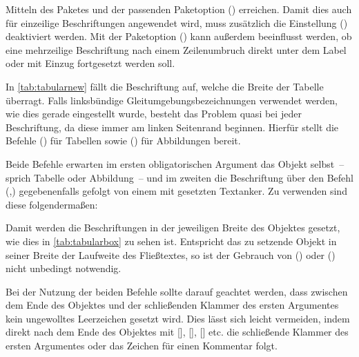 \documentclass[%
  english,ngerman,%
  cdgeometry=no,DIV=12,%
  automark,%
  listof=toc,%
]{tudscrartcl}
\begin{document}
Mitteln des Paketes  und der passenden Paketoption 
() erreichen. Damit dies auch für 
einzeilige Beschriftungen angewendet wird, muss zusätzlich die Einstellung 
() deaktiviert werden. Mit der 
Paketoption () kann außerdem beeinflusst 
werden, ob eine mehrzeilige Beschriftung nach einem Zeilenumbruch direkt unter 
dem Label oder mit Einzug fortgesetzt werden soll.
%
\begin{Preamble*}
\captionsetup{singlelinecheck=off,format=hang,justification=raggedright}
\end{Preamble*}
%
In \autoref{tab:tabularnew} fällt die Beschriftung auf, welche die Breite der 
Tabelle überragt. Falls linksbündige Gleitumgebungsbezeichnungen verwendet 
werden, wie dies gerade eingestellt wurde, besteht das Problem quasi bei jeder 
Beschriftung, da diese immer am linken Seitenrand beginnen. Hierfür stellt 
 die Befehle () für Tabellen 
sowie () für Abbildungen bereit. 

Beide Befehle erwarten im ersten obligatorischen Argument das Objekt selbst~-- 
sprich Tabelle oder Abbildung~-- und im zweiten die Beschriftung über den 
Befehl (,) gegebenenfalls 
gefolgt von einem mit  gesetzten Textanker. Zu verwenden sind 
diese folgendermaßen:
%
%
Damit werden die Beschriftungen in der jeweiligen Breite des Objektes gesetzt, 
wie dies in \autoref{tab:tabularbox} zu sehen ist. Entspricht das zu setzende 
Objekt in seiner Breite der Laufweite des Fließtextes, so ist der Gebrauch von 
() oder ()
nicht unbedingt notwendig.

Bei der Nutzung der beiden Befehle sollte darauf geachtet werden, dass zwischen 
dem Ende des Objektes und der schließenden Klammer des ersten Argumentes kein 
ungewolltes Leerzeichen gesetzt wird. Dies lässt sich leicht vermeiden, indem 
direkt nach dem Ende des Objektes mit [], 
[], [] etc. die 
schließende Klammer des ersten Argumentes oder das Zeichen für einen Kommentar 
\PValue{\%} folgt.
\end{document}
